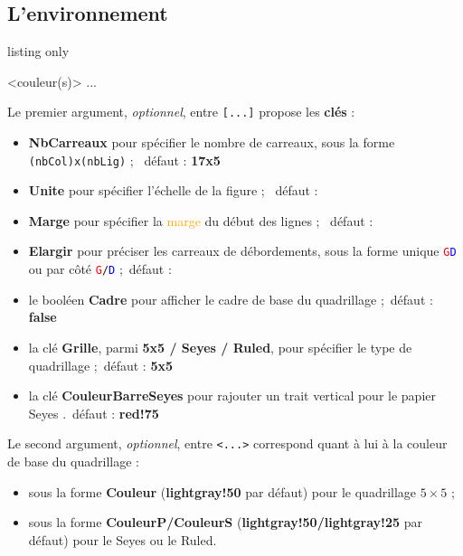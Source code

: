 \documentclass[a4paper]{article}
\newcommand\Cle[1]{{\bfseries\sffamily\textlangle #1\textrangle}}
\begin{document}
\subsection{L'environnement}

\begin{PresentationCode}{listing only}

\begin{EnvQuadrillage}[clés]<couleur(s)>
	...
\end{EnvQuadrillage}
\end{PresentationCode}

Le premier argument, \textit{optionnel}, entre \texttt{[...]} propose les \Cle{clés} :

\begin{itemize}
	\item \Cle{NbCarreaux} pour spécifier le nombre de carreaux, sous la forme \texttt{(nbCol)x(nbLig)} ; \hfill~défaut : \Cle{17x5}
	\item \Cle{Unite} pour spécifier l'échelle de la figure ; \hfill~défaut : \Cle{1}
	\item \Cle{Marge} pour spécifier la \textcolor{orange}{marge} du début des lignes ; \hfill~défaut : \Cle{0}
	\item \Cle{Elargir} pour préciser les carreaux de débordements, sous la forme unique \texttt{\textcolor{red}{G}\textcolor{blue}{D}} ou par côté \texttt{\textcolor{red}{G}/\textcolor{blue}{D}} ;\hfill~défaut : \Cle{0}
	\item le booléen \Cle{Cadre} pour afficher le cadre de base du quadrillage ;\hfill~défaut : \Cle{false}
	\item la clé \Cle{Grille}, parmi \Cle{5x5 / Seyes / Ruled}, pour spécifier le type de quadrillage ;\hfill~défaut : \Cle{5x5}
	\item la clé \Cle{CouleurBarreSeyes} pour rajouter un trait vertical pour le papier Seyes .\hfill~défaut : \Cle{red!75}
\end{itemize}

Le second argument, \textit{optionnel}, entre \texttt{<...>} correspond quant à lui à la couleur de base du quadrillage :

\begin{itemize}
	\item sous la forme \Cle{Couleur} (\Cle{lightgray!50} par défaut) pour le quadrillage $5\times5$ ;
	\item sous la forme \Cle{CouleurP/CouleurS} (\Cle{lightgray!50/lightgray!25} par défaut) pour le Seyes ou le Ruled.
\end{itemize}
\end{document}
